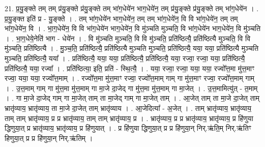 \documentclass[17pt]{extarticle}
\begin{document}
21. प्र॒यु॒ङ्क्ते तम् तम् प्र॑यु॒ङ्क्ते प्र॑यु॒ङ्क्ते तम् भा॑ग॒धेये॑न भाग॒धेये॑न॒ तम् प्र॑यु॒ङ्क्ते प्र॑यु॒ङ्क्ते तम् भा॑ग॒धेये॑न । . प्र॒यु॒ङ्क्त इति॑ प्र - यु॒ङ्क्ते । . तम् भा॑ग॒धेये॑न भाग॒धेये॑न॒ तम् तम् भा॑ग॒धेये॑न॒ वि वि भा॑ग॒धेये॑न॒ तम् तम् भा॑ग॒धेये॑न॒ वि । . भा॒ग॒धेये॑न॒ वि वि भा॑ग॒धेये॑न भाग॒धेये॑न॒ वि मु॑ञ्चति मुञ्चति॒ वि भा॑ग॒धेये॑न भाग॒धेये॑न॒ वि मु॑ञ्चति । . भा॒ग॒धेये॒नेति॑ भाग - धेये॑न । . वि मु॑ञ्चति मुञ्चति॒ वि वि मु॑ञ्चति॒ प्रति॑ष्ठित्यै॒ प्रति॑ष्ठित्यै मुञ्चति॒ वि वि मु॑ञ्चति॒ प्रति॑ष्ठित्यै । . मु॒ञ्च॒ति॒ प्रति॑ष्ठित्यै॒ प्रति॑ष्ठित्यै मुञ्चति मुञ्चति॒ प्रति॑ष्ठित्यै॒ यया॒ यया॒ प्रति॑ष्ठित्यै मुञ्चति मुञ्चति॒ प्रति॑ष्ठित्यै॒ यया᳚ । . प्रति॑ष्ठित्यै॒ यया॒ यया॒ प्रति॑ष्ठित्यै॒ प्रति॑ष्ठित्यै॒ यया॒ रज्वा॒ रज्वा॒ यया॒ प्रति॑ष्ठित्यै॒ प्रति॑ष्ठित्यै॒ यया॒ रज्वा᳚ । . प्रति॑ष्ठित्या॒ इति॒ प्रति॑ - स्थि॒त्यै॒ । . यया॒ रज्वा॒ रज्वा॒ यया॒ यया॒ रज्वो᳚त्त॒मा मु॑त्त॒माꣳ रज्वा॒ यया॒ यया॒ रज्वो᳚त्त॒माम् । . रज्वो᳚त्त॒मा मु॑त्त॒माꣳ रज्वा॒ रज्वो᳚त्त॒माम् गाम् गा मु॑त्त॒माꣳ रज्वा॒ रज्वो᳚त्त॒माम् गाम् । . उ॒त्त॒माम् गाम् गा मु॑त्त॒मा मु॑त्त॒माम् गा मा॒जे दा॒जेद् गा मु॑त्त॒मा मु॑त्त॒माम् गा मा॒जेत् । . उ॒त्त॒मामित्यु॑त् - त॒माम् । . गा मा॒जे दा॒जेद् गाम् गा मा॒जेत् ताम् ता मा॒जेद् गाम् गा मा॒जेत् ताम् । . आ॒जेत् ताम् ता मा॒जे दा॒जेत् ताम् भ्रातृ॑व्याय॒ भ्रातृ॑व्याय॒ ता मा॒जे दा॒जेत् ताम् भ्रातृ॑व्याय । . आ॒जेदित्या᳚ - अ॒जेत् । . ताम् भ्रातृ॑व्याय॒ भ्रातृ॑व्याय॒ ताम् ताम् भ्रातृ॑व्याय॒ प्र प्र भ्रातृ॑व्याय॒ ताम् ताम् भ्रातृ॑व्याय॒ प्र । . भ्रातृ॑व्याय॒ प्र प्र भ्रातृ॑व्याय॒ भ्रातृ॑व्याय॒ प्र हि॑णुया द्धिणुया॒त् प्र भ्रातृ॑व्याय॒ भ्रातृ॑व्याय॒ प्र हि॑णुयात् । . प्र हि॑णुया द्धिणुया॒त् प्र प्र हि॑णुया॒न् निर्.ऋ॑ति॒म् निर्.ऋ॑तिꣳ हिणुया॒त् प्र प्र हि॑णुया॒न् निर्.ऋ॑तिम् । \newline
\end{document}
